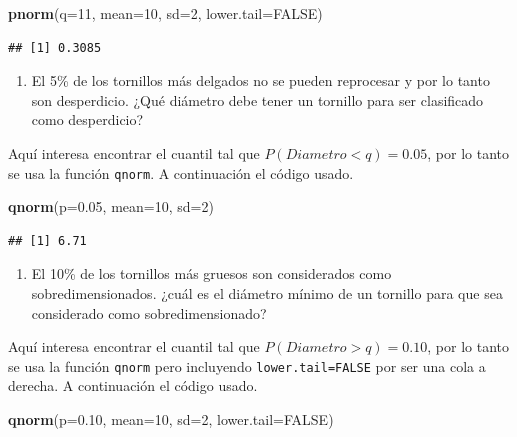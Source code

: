 \documentclass[10pt,]{krantz}
\makeatletter
\newenvironment{Shaded}{\begin{snugshade}}{\end{snugshade}}
\newcommand{\KeywordTok}[1]{\textcolor[rgb]{0.13,0.29,0.53}{\textbf{{#1}}}}
\newcommand{\DataTypeTok}[1]{\textcolor[rgb]{0.13,0.29,0.53}{{#1}}}
\newcommand{\DecValTok}[1]{\textcolor[rgb]{0.00,0.00,0.81}{{#1}}}
\newcommand{\FloatTok}[1]{\textcolor[rgb]{0.00,0.00,0.81}{{#1}}}
\newcommand{\OtherTok}[1]{\textcolor[rgb]{0.56,0.35,0.01}{{#1}}}
\newcommand{\NormalTok}[1]{{#1}}
\providecommand{\tightlist}{%
  \setlength{\itemsep}{0pt}\setlength{\parskip}{0pt}}
\newenvironment{kframe}{%
\medskip{}
\setlength{\fboxsep}{.8em}
 \def\at@end@of@kframe{}%
 \ifinner\ifhmode%
  \def\at@end@of@kframe{\end{minipage}}%
  \begin{minipage}{\columnwidth}%
 \fi\fi%
 \def\FrameCommand##1{\hskip\@totalleftmargin \hskip-\fboxsep
 \colorbox{shadecolor}{##1}\hskip-\fboxsep
     \hskip-\linewidth \hskip-\@totalleftmargin \hskip\columnwidth}%
 \MakeFramed {\advance\hsize-\width
   \@totalleftmargin\z@ \linewidth\hsize
   \@setminipage}}%
 {\par\unskip\endMakeFramed%
 \at@end@of@kframe}
\renewenvironment{Shaded}{\begin{kframe}}{\end{kframe}}
\makeatother
\begin{document}
\begin{Shaded}
\begin{Highlighting}[]
\KeywordTok{pnorm}\NormalTok{(}\DataTypeTok{q=}\DecValTok{11}\NormalTok{, }\DataTypeTok{mean=}\DecValTok{10}\NormalTok{, }\DataTypeTok{sd=}\DecValTok{2}\NormalTok{, }\DataTypeTok{lower.tail=}\OtherTok{FALSE}\NormalTok{)}
\end{Highlighting}
\end{Shaded}

\begin{verbatim}
## [1] 0.3085
\end{verbatim}

\begin{enumerate}
\def\labelenumi{\arabic{enumi})}
\setcounter{enumi}{2}
\tightlist
\item
  El 5\% de los tornillos más delgados no se pueden reprocesar y por lo
  tanto son desperdicio. ¿Qué diámetro debe tener un tornillo para ser
  clasificado como desperdicio?
\end{enumerate}

Aquí interesa encontrar el cuantil tal que \(P(Diametro<q)=0.05\), por
lo tanto se usa la función \texttt{qnorm}. A continuación el código
usado.

\begin{Shaded}
\begin{Highlighting}[]
\KeywordTok{qnorm}\NormalTok{(}\DataTypeTok{p=}\FloatTok{0.05}\NormalTok{, }\DataTypeTok{mean=}\DecValTok{10}\NormalTok{, }\DataTypeTok{sd=}\DecValTok{2}\NormalTok{)}
\end{Highlighting}
\end{Shaded}

\begin{verbatim}
## [1] 6.71
\end{verbatim}

\begin{enumerate}
\def\labelenumi{\arabic{enumi})}
\setcounter{enumi}{3}
\tightlist
\item
  El 10\% de los tornillos más gruesos son considerados como
  sobredimensionados. ¿cuál es el diámetro mínimo de un tornillo para
  que sea considerado como sobredimensionado?
\end{enumerate}

Aquí interesa encontrar el cuantil tal que \(P(Diametro>q)=0.10\), por
lo tanto se usa la función \texttt{qnorm} pero incluyendo
\texttt{lower.tail=FALSE} por ser una cola a derecha. A continuación el
código usado.

\begin{Shaded}
\begin{Highlighting}[]
\KeywordTok{qnorm}\NormalTok{(}\DataTypeTok{p=}\FloatTok{0.10}\NormalTok{, }\DataTypeTok{mean=}\DecValTok{10}\NormalTok{, }\DataTypeTok{sd=}\DecValTok{2}\NormalTok{, }\DataTypeTok{lower.tail=}\OtherTok{FALSE}\NormalTok{)}
\end{Highlighting}
\end{Shaded}
\end{document}
